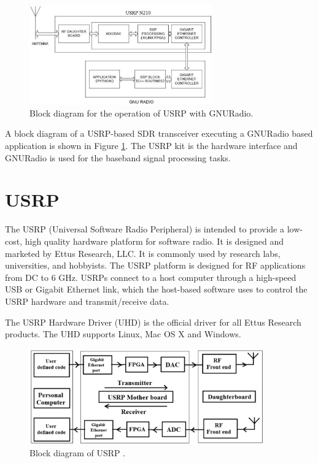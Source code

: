 \begin{figure}
  \centering
  \includegraphics[width=0.7\textwidth]{../images/usrpGNURadioBlock}
  \caption[USRP operation with GNURadio]{Block diagram for the operation of USRP
  with GNURadio.}
  \label{usrpGNURadioBlock}
\end{figure}

A block diagram of a USRP-based SDR transceiver executing a GNURadio based 
application is shown in Figure \ref{usrpGNURadioBlock}. The USRP kit is the 
hardware interface and GNURadio is used for the baseband signal processing
tasks.


\section{USRP}

The USRP (Universal Software Radio Peripheral) is intended to provide a 
low-cost, high quality hardware platform for software radio. It is designed
and marketed by Ettus Research, LLC. It is commonly used by research labs,
universities, and hobbyists. The USRP platform is designed for RF applications
from DC to 6 GHz. USRPs connect to a host computer through a high-speed USB or
Gigabit Ethernet link, which the host-based software uses to control the USRP
hardware and transmit/receive data.

The USRP Hardware Driver (UHD) is the official driver for all Ettus Research
products. The UHD supports Linux, Mac OS X and Windows.

\begin{figure}
\centering
\includegraphics[width=0.9\textwidth]{../images/usrpBlock}
\caption[Block diagram of USRP]{Block diagram of USRP 
\protect\cite{kranthi13}.}
\label{usrpBlock}
\end{figure}

